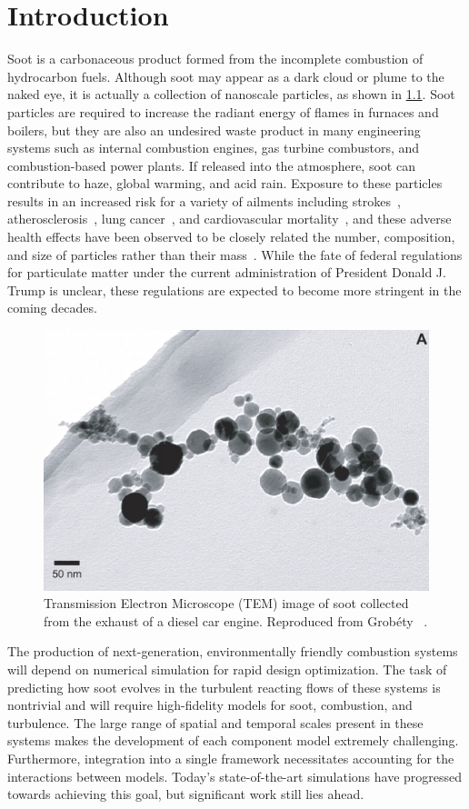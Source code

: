 \chapter{Introduction\label{ch:intro}}
 
Soot is a carbonaceous product formed from the incomplete combustion of hydrocarbon fuels. Although soot may appear as a dark cloud or plume to the naked eye, it is actually a collection of nanoscale particles, as shown in \cref{fig:intro:dieselsoot}. Soot particles are required to increase the radiant energy of flames in furnaces and boilers, but they are also an undesired waste product in many engineering systems such as internal combustion engines, gas turbine combustors, and combustion-based power plants. If released into the atmosphere, soot can contribute to haze, global warming, and acid rain. Exposure to these particles results in an increased risk for a variety of ailments including strokes~\cite{popeiii2006}, atherosclerosis~\cite{polichetti2009,kennedy2007,popeiii2006}, lung cancer~\cite{kennedy2007,popeiii2006}, and cardiovascular mortality~\cite{polichetti2009,kennedy2007,popeiii2006}, and these adverse health effects have been observed to be closely related the number, composition, and size of particles rather than their mass~\cite{seaton1995,lighty2000}. While the fate of federal regulations for particulate matter under the current administration of President Donald J. Trump is unclear, these regulations are expected to become more stringent in the coming decades. 

\begin{figure}[htb]
  \centering
  \includegraphics[width=0.4\linewidth]{ch-intro/figures/diesel-soot}
  \caption[Soot From Diesel Car Engine]{Transmission Electron Microscope (TEM) image of soot collected from the exhaust of a diesel car engine. Reproduced from Grob\'ety \etal~\cite{grobety2010}.}
  \label{fig:intro:dieselsoot}
\end{figure}

The production of next-generation, environmentally friendly combustion systems will depend on numerical simulation for rapid design optimization. The task of predicting how soot evolves in the turbulent reacting flows of these systems is nontrivial and will require high-fidelity models for soot, combustion, and turbulence. The large range of spatial and temporal scales present in these systems makes the development of each component model extremely challenging. Furthermore, integration into a single framework necessitates accounting for the interactions between models. Today's state-of-the-art simulations have progressed towards achieving this goal, but significant work still lies ahead. 

